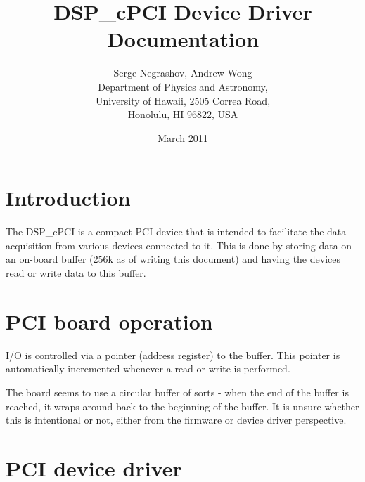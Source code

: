 \documentclass[12pt]{article}
\begin{document}
\title{DSP\_cPCI Device Driver Documentation}
\author{ Serge Negrashov, Andrew Wong \\
	 Department of Physics and Astronomy,\\
	 University of Hawaii, 2505 Correa Road,\\
	 Honolulu, HI 96822, USA
}
\date{March 2011}
\maketitle

\tableofcontents

\section{Introduction}

The DSP\_cPCI is a compact PCI device that is intended to facilitate the data acquisition from various devices connected to it.  This is done by storing data on an on-board buffer (256k as of writing this document) and having the devices read or write data to this buffer.

\section{PCI board operation}

I/O is controlled via a pointer (address register) to the buffer.  This pointer is automatically incremented whenever a read or write is performed. 

The board seems to use a circular buffer of sorts - when the end of the buffer is reached, it wraps around back to the beginning of the buffer.  It is unsure whether this is intentional or not, either from the firmware or device driver perspective.


\section{PCI device driver}
\end{document}
